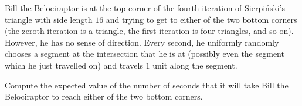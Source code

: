 Bill the Belociraptor is at the top corner of the fourth iteration of Sierpi\'nski's triangle with side length $16$ and trying to get to either of the two bottom corners (the zeroth iteration is a triangle, the first iteration is four triangles, and so on). However, he has no sense of direction. Every second, he uniformly randomly chooses a segment at the intersection that he is at (possibly even the segment which he just travelled on) and travels $1$ unit along the segment.

Compute the expected value of the number of seconds that it will take Bill the Belociraptor to reach either of the two bottom corners.
